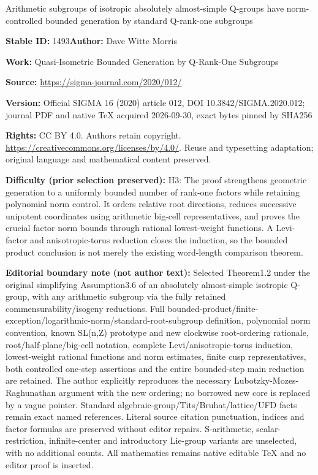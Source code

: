 \documentclass[11pt]{article}
\numberwithin{equation}{section}
\numberwithin{equation}{section}
\theoremstyle{definition}
\begin{document}
\begin{center}\Large Arithmetic subgroups of isotropic absolutely almost-simple Q-groups have norm-controlled bounded generation by standard Q-rank-one subgroups\end{center}
\noindent\textbf{Stable ID:} 1493\quad\textbf{Author:} Dave Witte Morris\par
\noindent\textbf{Work:} Quasi-Isometric Bounded Generation by Q-Rank-One Subgroups\par
\noindent\textbf{Source:} \url{https://sigma-journal.com/2020/012/}\par
\noindent\textbf{Version:} Official SIGMA 16 (2020) article 012, DOI 10.3842/SIGMA.2020.012; journal PDF and native TeX acquired 2026-09-30, exact bytes pinned by SHA256\par
\noindent\textbf{Rights:} CC BY 4.0. Authors retain copyright. \url{https://creativecommons.org/licenses/by/4.0/}. Reuse and typesetting adaptation; original language and mathematical content preserved.\par
\noindent\textbf{Difficulty (prior selection preserved):} {\CJKfont H3: The proof strengthens geometric generation to a uniformly bounded number of rank-one factors while retaining polynomial norm control. It orders relative root directions, reduces successive unipotent coordinates using arithmetic big-cell representatives, and proves the crucial factor norm bounds through rational lowest-weight functions. A Levi-factor and anisotropic-torus reduction closes the induction, so the bounded product conclusion is not merely the existing word-length comparison theorem.}\par
\medskip\noindent\textbf{Editorial boundary note (not author text):} Selected Theorem1.2 under the original simplifying Assumption3.6 of an absolutely almost-simple isotropic Q-group, with any arithmetic subgroup via the fully retained commensurability/isogeny reductions. Full bounded-product/finite-exception/logarithmic-norm/standard-root-subgroup definition, polynomial norm convention, known SL(n,Z) prototype and new clockwise root-ordering rationale, root/half-plane/big-cell notation, complete Levi/anisotropic-torus induction, lowest-weight rational functions and norm estimates, finite cusp representatives, both controlled one-step assertions and the entire bounded-step main reduction are retained. The author explicitly reproduces the necessary Lubotzky-Mozes-Raghunathan argument with the new ordering; no borrowed new core is replaced by a vague pointer. Standard algebraic-group/Tits/Bruhat/lattice/UFD facts remain exact named references. Literal source citation punctuation, indices and factor formulas are preserved without editor repairs. S-arithmetic, scalar-restriction, infinite-center and introductory Lie-group variants are unselected, with no additional counts. All mathematics remains native editable TeX and no editor proof is inserted.\par
\end{document}
